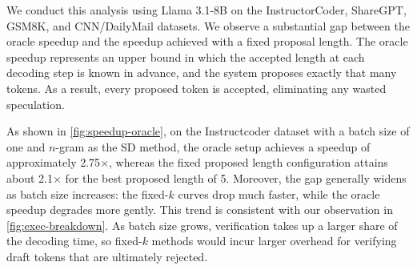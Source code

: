 \documentclass{article}
\begin{document}
We conduct this analysis using Llama 3.1-8B on the InstructorCoder, ShareGPT, GSM8K, and CNN/DailyMail datasets. We observe a substantial gap between the oracle speedup and the speedup achieved with a fixed proposal length. The oracle speedup represents an upper bound in which the accepted length at each decoding step is known in advance, and the system proposes exactly that many tokens. As a result, every proposed token is accepted, eliminating any wasted speculation.

 As shown in \autoref{fig:speedup-oracle}, on the Instructcoder dataset with a batch size of one and $n$-gram as the SD method, the oracle setup achieves a speedup of approximately 2.75$\times$, whereas the fixed proposed length configuration attains about 2.1$\times$ for the best proposed length of 5. Moreover, the gap generally widens as batch size increases: the fixed-$k$ curves drop much faster, while the oracle speedup degrades more gently. This trend is consistent with our observation in \autoref{fig:exec-breakdown}. As batch size grows, verification takes up a larger share of the decoding time, so fixed-$k$ methods would incur larger overhead for verifying draft tokens that are ultimately rejected.




\end{document}
